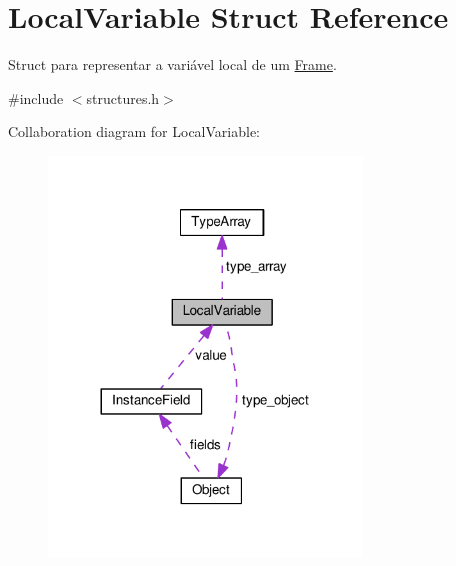 \hypertarget{structLocalVariable}{}\section{Local\+Variable Struct Reference}
\label{structLocalVariable}


Struct para representar a variável local de um \hyperlink{structFrame}{Frame}.  




{\ttfamily \#include $<$structures.\+h$>$}



Collaboration diagram for Local\+Variable\+:
\nopagebreak
\begin{figure}[H]
\begin{center}
\leavevmode
\includegraphics[width=236pt]{structLocalVariable__coll__graph}
\end{center}
\end{figure}
